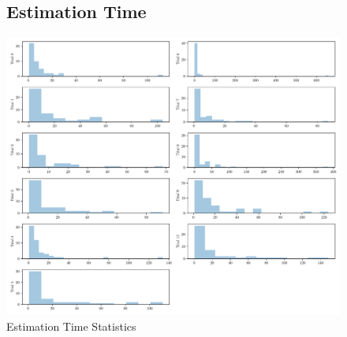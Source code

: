 \documentclass{report}
\theoremstyle{definition}
\begin{document}
\begin{figure}[H]
\hspace*{-3cm}
\begin{minipage}{1.5\linewidth}
\subsection{Estimation Time}
    \centering
    \centerline{
    \includegraphics[width=\textwidth]{exp1_stats_estim.pdf}}
    \caption{Estimation Time Statistics}
    \label{fig:exp1_stats_estim}
\end{minipage}
\end{figure}
\end{document}
